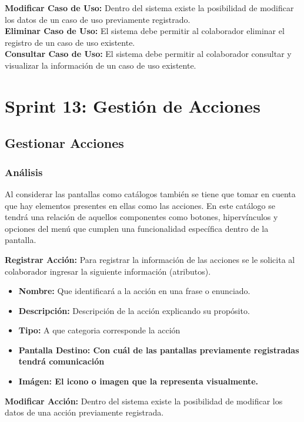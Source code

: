 \textbf {Modificar Caso de Uso:}
Dentro del sistema existe la posibilidad de modificar los datos de un caso de uso previamente registrado.\\

\textbf {Eliminar Caso de Uso:} 
El sistema debe permitir al colaborador eliminar el registro de un caso de uso existente.\\

\textbf {Consultar Caso de Uso:} 
El sistema debe permitir al colaborador consultar y visualizar la información de un caso de uso existente.\\

\section{Sprint 13: Gestión de Acciones}

\subsection{Gestionar Acciones}
\subsubsection {Análisis}
Al considerar las pantallas como catálogos también se tiene que tomar en cuenta que hay elementos presentes en ellas como las acciones. En este catálogo se tendrá una relación de aquellos componentes como botones, hipervínculos y opciones del menú que cumplen una funcionalidad específica dentro de la pantalla.

\textbf {Registrar Acción:}
Para registrar la información de las acciones se le solicita al colaborador ingresar la siguiente información (atributos).
\begin{itemize}
	
	\item \textbf{Nombre:} Que identificará a la acción en una frase o enunciado.
	\item \textbf{Descripción:} Descripción de la acción explicando su propósito.
	\item \textbf{Tipo:} A que categoria corresponde la acción
	\item \textbf{Pantalla Destino: Con cuál de las pantallas previamente registradas tendrá comunicación}
	\item \textbf{Imágen: El icono o imagen que la representa visualmente.}
\end{itemize}

\textbf {Modificar Acción:}
Dentro del sistema existe la posibilidad de modificar los datos de una acción previamente registrada.\\

